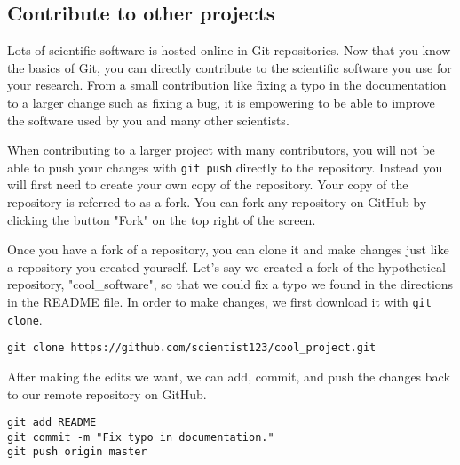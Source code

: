 \subsection{Contribute to other projects}

Lots of scientific software is hosted online in Git repositories.
Now that you know the basics of Git, you can directly contribute to the scientific software you use for your research.
From a small contribution like fixing a typo in the documentation to a larger change such as fixing a bug, it is empowering to be able to improve the software used by you and many other scientists.

When contributing to a larger project with many contributors, you will not be able to push your changes with \verb|git push| directly to the repository.
Instead you will first need to create your own copy of the repository.
Your copy of the repository is referred to as a fork.
You can fork any repository on GitHub by clicking the button "Fork" on the top right of the screen.

Once you have a fork of a repository, you can clone it and make changes just like a repository you created yourself.
Let's say we created a fork of the hypothetical repository, "cool_software", so that we could fix a typo we found in the directions in the README file.
In order to make changes, we first download it with \verb|git clone|.

\begin{lstlisting}
git clone https://github.com/scientist123/cool_project.git
\end{lstlisting}

After making the edits we want, we can add, commit, and push the changes back to our remote repository on GitHub.

\begin{lstlisting}
git add README
git commit -m "Fix typo in documentation."
git push origin master
\end{lstlisting}


